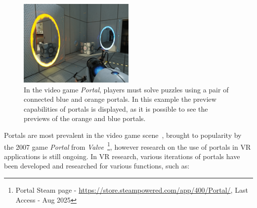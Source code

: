 \begin{figure}[b]
    \centering
     \includegraphics[width=0.5\textwidth]{NOVAthesisFiles/Images/papers/Portal-with-RTX-ultra-quality.png}
     \caption[Screenshot of the Portal video game]
     {In the video game \textit{Portal}, players must solve puzzles using a pair of connected blue and orange portals. In this example the preview 
     capabilities of portals is displayed, as it is possible to see the previews of the orange and blue portals.}
     \label{fig:portal}
\end{figure}

Portals are most prevalent in the video game scene~\cite{Murray2019}, brought to popularity by the 2007 game \textit{Portal} from 
\textit{Valve}~\footnote{Portal Steam page - \href{https://store.steampowered.com/app/400/Portal/}{https://store.steampowered.com/app/400/Portal/}, Last Access - Aug 2025 }, 
however research on the use of portals in \gls{VR} applications is still ongoing. In \gls{VR} research, various iterations of portals 
have been developed and researched for various functions, such as:


